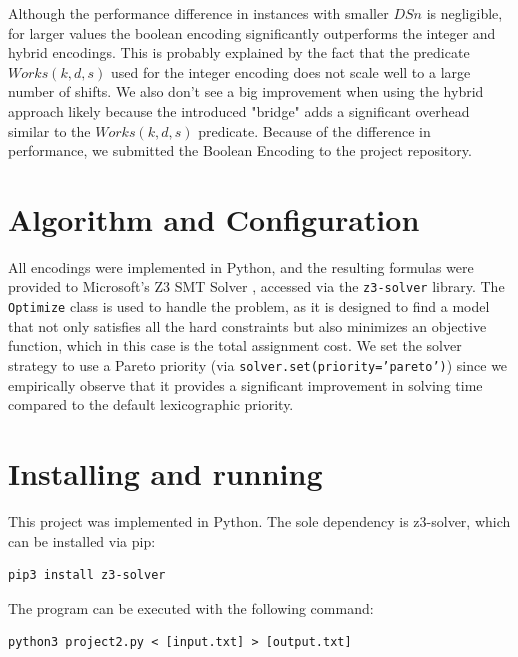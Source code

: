 \documentclass[sigconf, 10pt]{acmart}
\begin{document}
Although the performance difference in instances with smaller $DSn$ is negligible, for larger values the boolean encoding significantly outperforms the integer and hybrid encodings. This is probably explained by the fact that the predicate $Works(k, d, s)$ used for the integer encoding does not scale well to a large number of shifts. We also don't see a big improvement when using the hybrid approach likely because the introduced "bridge" adds a significant overhead similar to the $Works(k, d, s)$ predicate. Because of the difference in performance, we submitted the Boolean Encoding to the project repository.

\section{Algorithm and Configuration}
All encodings were implemented in Python, and the resulting formulas were provided to Microsoft's Z3 SMT Solver \cite{z3}, accessed via the \texttt{z3-solver} library. The \texttt{Optimize} class is used to handle the problem, as it is designed to find a model that not only satisfies all the hard constraints but also minimizes an objective function, which in this case is the total assignment cost. We set the solver strategy to use a Pareto priority (via \texttt{solver.set(priority='pareto')}) since we empirically observe that it provides a significant improvement in solving time compared to the default lexicographic priority.

\section{Installing and running}
This project was implemented in Python. The sole dependency is z3-solver, which can be installed via pip:
\begin{verbatim}
pip3 install z3-solver
\end{verbatim}
The program can be executed with the following command:
\begin{verbatim}
python3 project2.py < [input.txt] > [output.txt]
\end{verbatim}




\newpage
\end{document}
